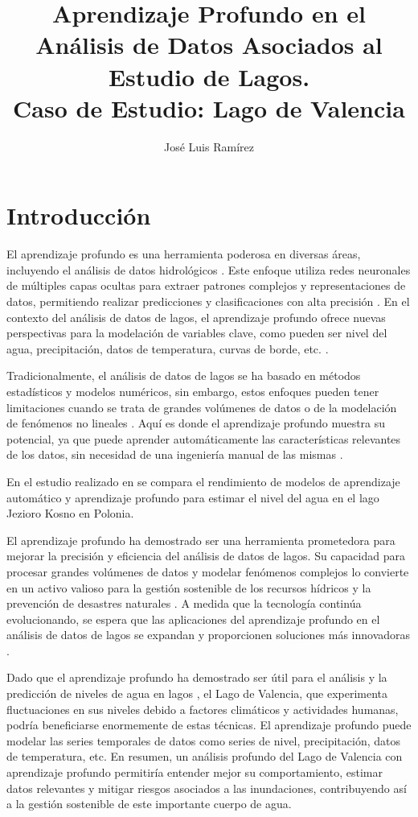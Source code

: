 \documentclass[12pt]{article}
\title{Aprendizaje Profundo en el Análisis de Datos Asociados al Estudio de Lagos. \\ Caso de Estudio: Lago de Valencia}
\author{José Luis Ramírez}
\date{}
\begin{document}
\maketitle

\section{Introducción}
El aprendizaje profundo es una herramienta poderosa en diversas áreas, incluyendo el análisis de datos hidrológicos \autocite{ayus2023}. Este enfoque utiliza redes neuronales de múltiples capas ocultas para extraer patrones complejos y representaciones de datos, permitiendo realizar predicciones y clasificaciones con alta precisión \cite{bentivoglio2022}. En el contexto del análisis de datos de lagos, el aprendizaje profundo ofrece nuevas perspectivas para la modelación de variables clave, como pueden ser nivel del agua, precipitación, datos de temperatura, curvas de borde, etc. \cite{higham2019}.

Tradicionalmente, el análisis de datos de lagos se ha basado en métodos estadísticos y modelos numéricos, sin embargo, estos enfoques pueden tener limitaciones cuando se trata de grandes volúmenes de datos o de la modelación de fenómenos no lineales \cite{ayus2023,higham2019}. Aquí es donde el aprendizaje profundo muestra su potencial, ya que puede aprender automáticamente las características relevantes de los datos, sin necesidad de una ingeniería manual de las mismas \cite{bentivoglio2022}.

En el estudio realizado en \cite{ayus2023} se compara el rendimiento de modelos de aprendizaje automático y aprendizaje profundo para estimar el nivel del agua en el lago Jezioro Kosno en Polonia.

El aprendizaje profundo ha demostrado ser una herramienta prometedora para mejorar la precisión y eficiencia del análisis de datos de lagos. Su capacidad para procesar grandes volúmenes de datos y modelar fenómenos complejos lo convierte en un activo valioso para la gestión sostenible de los recursos hídricos y la prevención de desastres naturales \cite{bentivoglio2022}. A medida que la tecnología continúa evolucionando, se espera que las aplicaciones del aprendizaje profundo en el análisis de datos de lagos se expandan y proporcionen soluciones más innovadoras \cite{bentivoglio2022,higham2019}.

Dado que el aprendizaje profundo ha demostrado ser útil para el análisis y la predicción de niveles de agua en lagos \cite{ayus2023}, el Lago de Valencia, que experimenta fluctuaciones en sus niveles debido a factores climáticos y actividades humanas, podría beneficiarse enormemente de estas técnicas. El aprendizaje profundo puede modelar las series temporales de datos como series de nivel, precipitación, datos de temperatura, etc. En resumen, un análisis profundo del Lago de Valencia con aprendizaje profundo permitiría entender mejor su comportamiento, estimar datos relevantes y mitigar riesgos asociados a las inundaciones, contribuyendo así a la gestión sostenible de este importante cuerpo de agua.
\end{document}
